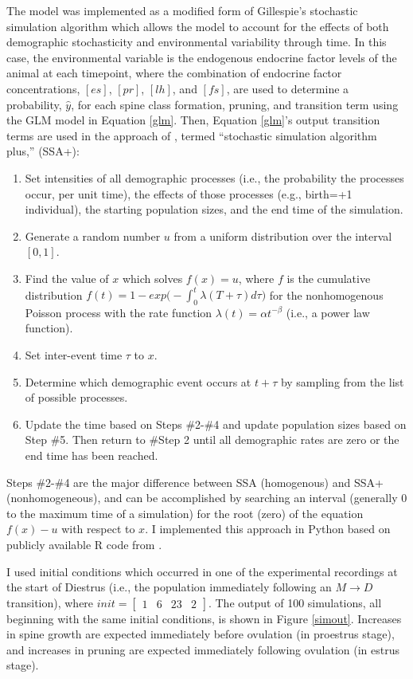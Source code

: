 \documentclass[11pt]{article}
\begin{document}
The model was implemented as a modified form of Gillespie's stochastic simulation algorithm\cite{gillespie} which allows the model to account for the effects of both demographic stochasticity and environmental variability through time\cite{legault}. In this case, the environmental variable is the endogenous endocrine factor levels of the animal at each timepoint, where the combination of endocrine factor concentrations, $[es]$, $[pr]$, $[lh]$, and $[fs]$, are used to determine a probability, $\hat{y}$, for each spine class formation, pruning, and transition term using the GLM model in Equation \ref{glm}. Then, Equation \ref{glm}'s output transition terms are used in the approach of \cite{legault}, termed ``stochastic simulation algorithm plus,'' (SSA+):
\begin{enumerate}[noitemsep, topsep=0pt]
\item Set intensities of all demographic processes (i.e., the probability the processes occur, per unit time), the effects of those processes (e.g., birth=+1 individual), the starting population sizes, and the end time of the simulation.
\item Generate a random number $u$ from a uniform distribution over the interval $[0,1]$.
\item Find the value of $x$ which solves $f(x) = u$, where $f$ is the cumulative distribution $f(t)=1-exp\big(-\int_0^t \lambda(T+\tau)d\tau \big)$ for the nonhomogenous Poisson process with the rate function $\lambda(t)=\alpha t ^{-\beta}$ (i.e., a power law function).
\item Set inter-event time $\tau$ to $x$.
\item Determine which demographic event occurs at $t+\tau$ by sampling from the list of possible processes.
\item Update the time based on Steps \#2-\#4 and update population sizes based on Step \#5. Then return to \#Step 2 until all demographic rates are zero or the end time has been reached.
\end{enumerate}
Steps \#2-\#4 are the major difference between SSA (homogenous) and SSA+ (nonhomogeneous), and can be accomplished by searching an interval (generally $0$ to the maximum time of a simulation) for the root (zero) of the equation $f(x)-u$ with respect to $x$. I implemented this approach in Python based on publicly available R code from \cite{legault}.

I used initial conditions which occurred in one of the experimental recordings at the start of Diestrus (i.e., the population immediately following an $M\to D$ transition), where $init=\begin{bmatrix}1&6&23&2\end{bmatrix}$. The output of 100 simulations, all beginning with the same initial conditions, is shown in Figure \ref{simout}. Increases in spine growth are expected immediately before ovulation (in proestrus stage), and increases in pruning are expected immediately following ovulation (in estrus stage).
\end{document}
